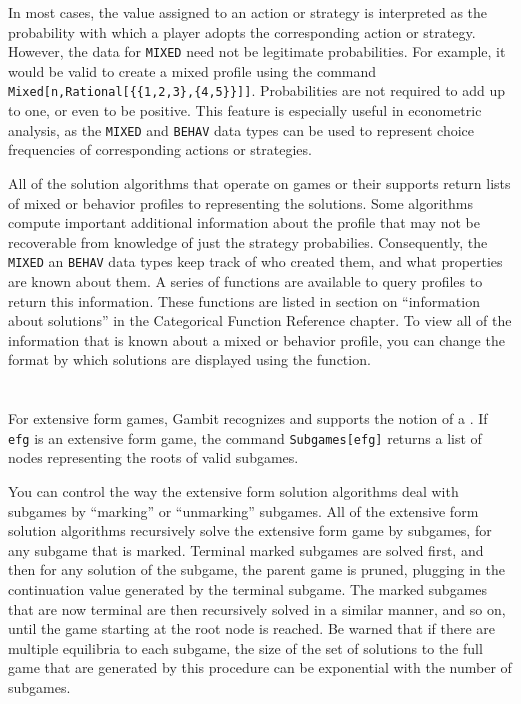 In most cases, the value assigned to an action or strategy is
interpreted as the probability with which a player adopts the
corresponding action or strategy.  However, the data for \verb+MIXED+
need not be legitimate probabilities.  For example, it would be valid
to create a mixed profile using the command
\verb+Mixed[n,Rational[{{1,2,3},{4,5}}]]+.  Probabilities are not
required to add up to one, or even to be positive.  This feature is
especially useful in econometric analysis, as the \verb+MIXED+ and
\verb+BEHAV+ data types can be used to represent choice frequencies of
corresponding actions or strategies.  

All of the solution algorithms that operate on games or their supports
return lists of mixed or behavior profiles to representing the
solutions.  Some algorithms compute important additional information
about the profile that may not be recoverable from knowledge of just
the strategy probabilies.  Consequently, the \verb+MIXED+ an
\verb+BEHAV+ data types keep track of who created them, and what
properties are known about them.  A series of functions are available
to query profiles to return this information.  These functions are
listed in section on ``information about solutions'' in the
Categorical Function Reference chapter.  To view all of the
information that is known about a mixed or behavior profile, you can
change the format by which solutions are displayed using the
 function.

\section{}

For extensive form games, Gambit recognizes and supports the notion of
a .  If \verb+efg+ is an extensive form game, the
command \verb+Subgames[efg]+ returns a list of nodes
representing the roots of valid subgames.

You can control the way the extensive form solution algorithms deal
with subgames by ``marking'' or ``unmarking'' subgames.  All of the
extensive form solution algorithms recursively solve the extensive
form game by subgames, for any subgame that is marked.  Terminal
marked subgames are solved first, and then for any solution of the
subgame, the parent game is pruned, plugging in the continuation value
generated by the terminal subgame.  The marked subgames that are now
terminal are then recursively solved in a similar manner, and so on,
until the game starting at the root node is reached.  Be warned that
if there are multiple equilibria to each subgame, the size of the set
of solutions to the full game that are generated by this procedure can
be exponential with the number of subgames.

